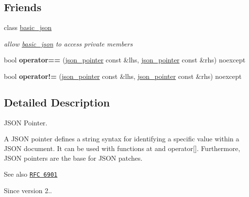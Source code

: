 \subsection*{Friends}
\begin{DoxyCompactItemize}
\item 
\mbox{\label{classnlohmann_1_1json__pointer_ada3100cdb8700566051828f1355fa745}} 
class \hyperlink{classnlohmann_1_1json__pointer_ada3100cdb8700566051828f1355fa745}{basic\+\_\+json}
\begin{DoxyCompactList}\small\item\em allow \hyperlink{classnlohmann_1_1basic__json}{basic\+\_\+json} to access private members \end{DoxyCompactList}\item 
\mbox{\label{classnlohmann_1_1json__pointer_a4667ef558c8c3f8a646bfda0c6654653}} 
bool {\bfseries operator==} (\hyperlink{classnlohmann_1_1json__pointer}{json\+\_\+pointer} const \&lhs, \hyperlink{classnlohmann_1_1json__pointer}{json\+\_\+pointer} const \&rhs) noexcept
\item 
\mbox{\label{classnlohmann_1_1json__pointer_a6779edcf28e6f018a3bbb29c0b4b5e1e}} 
bool {\bfseries operator!=} (\hyperlink{classnlohmann_1_1json__pointer}{json\+\_\+pointer} const \&lhs, \hyperlink{classnlohmann_1_1json__pointer}{json\+\_\+pointer} const \&rhs) noexcept
\end{DoxyCompactItemize}


\subsection{Detailed Description}
J\+S\+ON Pointer. 

A J\+S\+ON pointer defines a string syntax for identifying a specific value within a J\+S\+ON document. It can be used with functions {\ttfamily at} and {\ttfamily operator\mbox{[}\mbox{]}}. Furthermore, J\+S\+ON pointers are the base for J\+S\+ON patches.

\begin{DoxySeeAlso}{See also}
\href{https://tools.ietf.org/html/rfc6901}{\tt R\+FC 6901}
\end{DoxySeeAlso}
\begin{DoxySince}{Since}
version 2.. 
\end{DoxySince}


